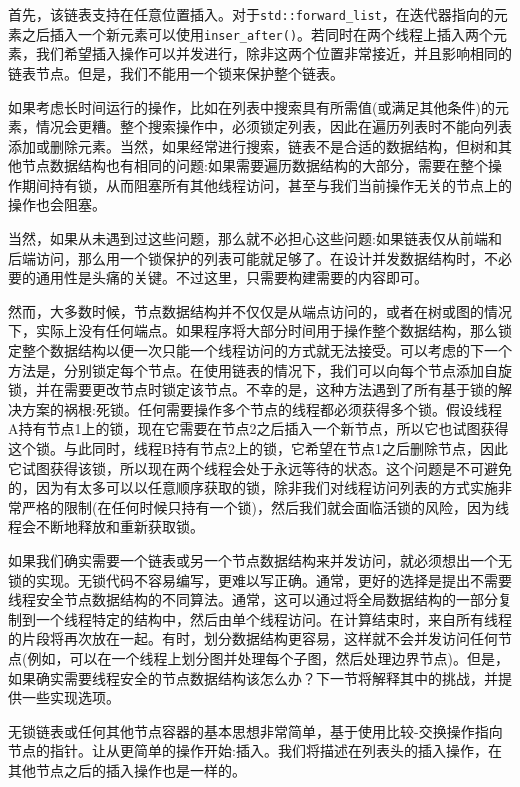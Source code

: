 首先，该链表支持在任意位置插入。对于\texttt{std::forward\_list}，在迭代器指向的元素之后插入一个新元素可以使用\texttt{inser\_after()}。若同时在两个线程上插入两个元素，我们希望插入操作可以并发进行，除非这两个位置非常接近，并且影响相同的链表节点。但是，我们不能用一个锁来保护整个链表。

如果考虑长时间运行的操作，比如在列表中搜索具有所需值(或满足其他条件)的元素，情况会更糟。整个搜索操作中，必须锁定列表，因此在遍历列表时不能向列表添加或删除元素。当然，如果经常进行搜索，链表不是合适的数据结构，但树和其他节点数据结构也有相同的问题:如果需要遍历数据结构的大部分，需要在整个操作期间持有锁，从而阻塞所有其他线程访问，甚至与我们当前操作无关的节点上的操作也会阻塞。

当然，如果从未遇到过这些问题，那么就不必担心这些问题:如果链表仅从前端和后端访问，那么用一个锁保护的列表可能就足够了。在设计并发数据结构时，不必要的通用性是头痛的关键。不过这里，只需要构建需要的内容即可。

然而，大多数时候，节点数据结构并不仅仅是从端点访问的，或者在树或图的情况下，实际上没有任何端点。如果程序将大部分时间用于操作整个数据结构，那么锁定整个数据结构以便一次只能一个线程访问的方式就无法接受。可以考虑的下一个方法是，分别锁定每个节点。在使用链表的情况下，我们可以向每个节点添加自旋锁，并在需要更改节点时锁定该节点。不幸的是，这种方法遇到了所有基于锁的解决方案的祸根:死锁。任何需要操作多个节点的线程都必须获得多个锁。假设线程A持有节点1上的锁，现在它需要在节点2之后插入一个新节点，所以它也试图获得这个锁。与此同时，线程B持有节点2上的锁，它希望在节点1之后删除节点，因此它试图获得该锁，所以现在两个线程会处于永远等待的状态。这个问题是不可避免的，因为有太多可以以任意顺序获取的锁，除非我们对线程访问列表的方式实施非常严格的限制(在任何时候只持有一个锁)，然后我们就会面临活锁的风险，因为线程会不断地释放和重新获取锁。

如果我们确实需要一个链表或另一个节点数据结构来并发访问，就必须想出一个无锁的实现。无锁代码不容易编写，更难以写正确。通常，更好的选择是提出不需要线程安全节点数据结构的不同算法。通常，这可以通过将全局数据结构的一部分复制到一个线程特定的结构中，然后由单个线程访问。在计算结束时，来自所有线程的片段将再次放在一起。有时，划分数据结构更容易，这样就不会并发访问任何节点(例如，可以在一个线程上划分图并处理每个子图，然后处理边界节点)。但是，如果确实需要线程安全的节点数据结构该怎么办？下一节将解释其中的挑战，并提供一些实现选项。


无锁链表或任何其他节点容器的基本思想非常简单，基于使用比较-交换操作指向节点的指针。让从更简单的操作开始:插入。我们将描述在列表头的插入操作，在其他节点之后的插入操作也是一样的。

